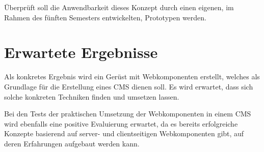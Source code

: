 Überprüft soll die Anwendbarkeit dieses Konzept durch einen eigenen, im Rahmen des fünften Semesters entwickelten, Prototypen werden.

\section{Erwartete Ergebnisse}

Als konkretes Ergebnis wird ein Gerüst mit Webkomponenten erstellt, welches als Grundlage für die Erstellung eines CMS dienen soll. Es wird erwartet, dass sich solche konkreten Techniken finden und umsetzen lassen.

Bei den Tests der praktischen Umsetzung der Webkomponenten in einem CMS wird ebenfalls eine positive Evaluierung erwartet, da es bereits erfolgreiche Konzepte basierend auf server- und clientseitigen Webkomponenten gibt, auf deren Erfahrungen aufgebaut werden kann.
